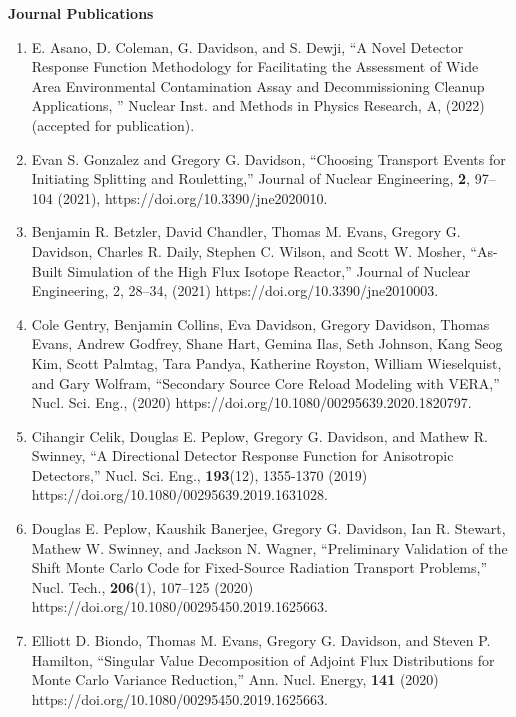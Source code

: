 \documentclass[letterpaper,11pt]{article}
\newlength{\outerbordwidth}
\newcommand{\resheading}[1]{\vspace{8pt}
  \parbox{\textwidth}{\setlength{\FrameSep}{\outerbordwidth}
    \begin{shaded}
      \setlength{\fboxsep}{0pt}\framebox[\textwidth][l]{\setlength{\fboxsep}{4pt}\fcolorbox{shadecolorB}{shadecolorB}{\textbf{\sffamily{\mbox{~}\makebox[6.762in][l]{\large #1} \vphantom{p\^{E}}}}}}
    \end{shaded}
  }\vspace{-5pt}
}
\newcommand{\leftsubheading}[1]{
  \textbf{#1\vspace{-6pt} \\}}
\begin{document}
\resheading{Publications}

\leftsubheading{Journal Publications}
\begin{enumerate}
  \item E. Asano, D. Coleman, G. Davidson, and S. Dewji, ``A Novel Detector 
    Response Function Methodology for Facilitating the Assessment of Wide Area 
    Environmental Contamination Assay and Decommissioning Cleanup Applications,
    '' Nuclear Inst. and Methods in Physics Research, A, (2022) (accepted for 
    publication).
  \item Evan S. Gonzalez and Gregory G. Davidson, ``Choosing Transport
    Events for Initiating Splitting and Rouletting,'' Journal of
    Nuclear Engineering, \textbf{2}, 97--104 (2021),
    https://doi.org/10.3390/jne2020010.
  \item Benjamin R. Betzler, David Chandler, Thomas M. Evans, Gregory
    G. Davidson, Charles R. Daily, Stephen C. Wilson, and Scott
    W. Mosher, ``As-Built Simulation of the High Flux Isotope
    Reactor,'' Journal of Nuclear Engineering, 2, 28–34, (2021)
    https://doi.org/10.3390/jne2010003.
  \item Cole Gentry, Benjamin Collins, Eva Davidson, Gregory Davidson,
    Thomas Evans, Andrew Godfrey, Shane Hart, Gemina Ilas, Seth
    Johnson, Kang Seog Kim, Scott Palmtag, Tara Pandya, Katherine
    Royston, William Wieselquist, and Gary Wolfram, ``Secondary Source
    Core Reload Modeling with VERA,'' Nucl. Sci. Eng., (2020)
    https://doi.org/10.1080/00295639.2020.1820797.
  \item Cihangir Celik, Douglas E. Peplow, Gregory G. Davidson, and
    Mathew R. Swinney, ``A Directional Detector Response Function for
    Anisotropic Detectors,'' Nucl. Sci. Eng., \textbf{193}(12),
    1355-1370 (2019) https://doi.org/10.1080/00295639.2019.1631028.
  \item Douglas E. Peplow, Kaushik Banerjee, Gregory G. Davidson, Ian
    R. Stewart, Mathew W. Swinney, and Jackson N. Wagner, ``Preliminary
    Validation of the Shift Monte Carlo Code for Fixed-Source
    Radiation Transport Problems,'' Nucl. Tech., \textbf{206}(1),
    107--125 (2020) https://doi.org/10.1080/00295450.2019.1625663.
  \item Elliott D. Biondo, Thomas M. Evans, Gregory G. Davidson, and
    Steven P. Hamilton, ``Singular Value Decomposition of Adjoint Flux
    Distributions for Monte Carlo Variance Reduction,''
    Ann. Nucl. Energy, \textbf{141} (2020)
    https://doi.org/10.1080/00295450.2019.1625663. 

\end{enumerate}
\end{document}

